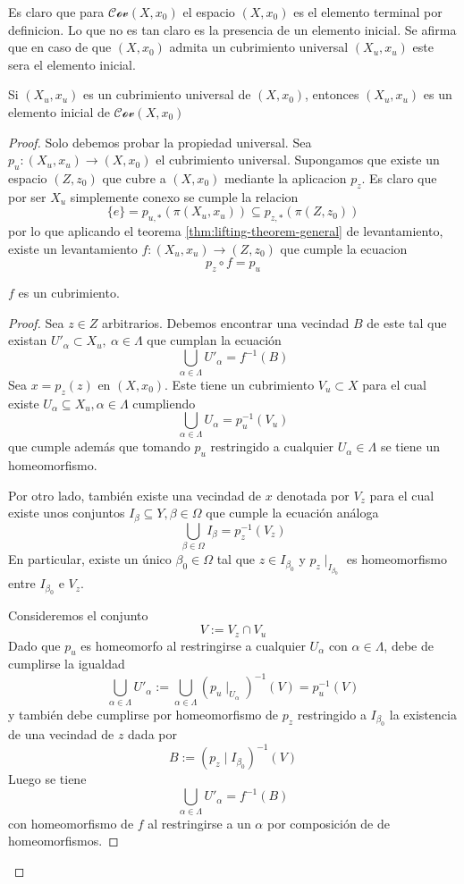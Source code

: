 Es claro que para \(\mathscr{Cov}(X, x_0)\) el espacio \((X, x_0)\) es
el elemento terminal por definicion. Lo que no es tan claro es la
presencia de un elemento inicial. Se afirma que en caso de que \((X,
x_0)\) admita un cubrimiento universal \((X_u, x_u)\) este sera el
elemento inicial.

\begin{teorema}
  Si \((X_u, x_u)\) es un cubrimiento universal de \((X, x_0)\),
  entonces \((X_u, x_u)\) es un elemento inicial de \(\mathscr{Cov} (X,
  x_0)\)
\end{teorema}
\begin{proof}
  Solo debemos probar la propiedad universal. Sea \(p_u : (X_u, x_u) \to
  (X, x_0)\) el cubrimiento universal. Supongamos que existe un espacio
  \((Z, z_0)\) que cubre a \((X, x_0)\) mediante la aplicacion
  \(p_{z}\). Es claro que por ser \(X_u\) simplemente conexo se
  cumple la relacion
  \[ \{e\} = p_{u,*} \left( \pi (X_u, x_u) \right) \subseteq p_{z,*}
    \left( \pi (Z, z_0) \right)\]
  por lo que aplicando el teorema \ref{thm:lifting-theorem-general} de
  levantamiento, existe un levantamiento \(f : (X_u, x_u) \to (Z,
  z_0)\) que cumple la ecuacion
  \[ p_{z} \circ f = p_u \]

  \begin{lema}
    \(f\) es un cubrimiento.
  \end{lema}
  \begin{proof}
  Sea \(z \in Z\) arbitrarios. Debemos encontrar una vecindad \(B\) de este
  tal que existan \(U'_\alpha \subset X_u,\ \alpha \in \Lambda \) que
  cumplan la ecuación
  \[ \bigcup_{\alpha \in \Lambda} U'_\alpha = f^{-1} (B) \]
  Sea \(x = p_z (z)\) en \((X,x_0)\). Este tiene un cubrimiento \(V_u
  \subset X\) para el cual existe \(U_\alpha \subseteq X_u, \alpha \in
  \Lambda\) cumpliendo
  \[ \bigcup_{\alpha \in \Lambda} U_\alpha = p_u^{-1} (V_u)\]
  que cumple además que tomando \(p_u\) restringido a cualquier \(U_\alpha
  \in \Lambda\) se tiene un homeomorfismo.

  Por otro lado, también existe una vecindad de \(x\) denotada por
  \(V_z\) para el cual existe unos conjuntos \(I_\beta \subseteq Y, \beta
  \in \Omega\) que cumple la ecuación análoga
  \[ \bigcup_{\beta \in \Omega} I_\beta = p_z^{-1} (V_z) \]
  En particular, existe un único \(\beta_0 \in \Omega\) tal que \( z \in
  I_{\beta_0} \) y \( p_{z} \mid_{I_{\beta_0}} \) es homeomorfismo entre
  \(I_{\beta_0}\) e \(V_z\).

  Consideremos el conjunto
  \[ V := V_z \cap V_u \]
  Dado que \(p_u\) es homeomorfo al restringirse a cualquier
  \(U_\alpha\) con \(\alpha \in \Lambda\), debe de cumplirse la igualdad
  \[ \bigcup_{\alpha \in \Lambda} U'_\alpha := \bigcup_{\alpha \in
      \Lambda} \left( p_u \mid_{U_\alpha} \right)^{-1} (V) = p_u^{-1} (V) \]
  y también debe cumplirse por homeomorfismo de \(p_z\) restringido a
  \(I_{\beta_0}\) la existencia de una vecindad de \(z\) dada por
  \[ B := \left( p_z \mid I_{\beta_0} \right) ^{-1} (V) \]
  Luego se tiene
  \[ \bigcup_{\alpha \in \Lambda} U'_\alpha = f^{-1} (B) \]
  con homeomorfismo de \(f\) al restringirse a un \(\alpha\) por
  composición de de homeomorfismos.
  \end{proof}


\end{proof}

